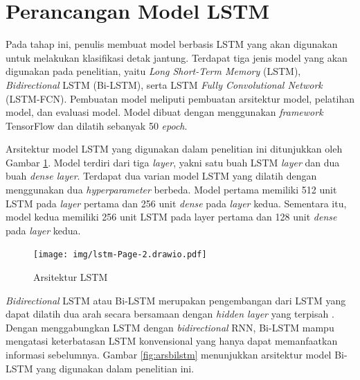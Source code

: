 
\section{Perancangan Model LSTM}
\label{subsec: bab4-pembuatan-model-lstm}
Pada tahap ini, penulis membuat model berbasis LSTM yang akan digunakan untuk melakukan klasifikasi detak jantung. 
Terdapat tiga jenis model yang akan digunakan pada penelitian, yaitu \textit{Long Short-Term Memory} (LSTM), \textit{Bidirectional} LSTM (Bi-LSTM), serta LSTM \textit{Fully Convolutional Network} (LSTM-FCN). 
Pembuatan model meliputi pembuatan arsitektur model, pelatihan model, dan evaluasi model.
Model dibuat dengan menggunakan \textit{framework} TensorFlow dan dilatih sebanyak 50 \textit{epoch}.




Arsitektur model LSTM yang digunakan dalam penelitian ini ditunjukkan oleh Gambar \ref{fig:arslstm}. Model terdiri dari tiga \textit{layer}, yakni satu buah LSTM \textit{layer} dan dua buah \textit{dense layer}. Terdapat dua varian model LSTM yang dilatih dengan menggunakan dua \textit{hyperparameter} berbeda. Model pertama memiliki 512 unit LSTM pada \textit{layer} pertama dan 256 unit \textit{dense} pada \textit{layer} kedua. Sementara itu, model kedua memiliki 256 unit LSTM pada layer pertama dan 128 unit \textit{dense} pada \textit{layer} kedua.

\begin{figure}[H]
  \centering
  \texttt{[image: img/lstm-Page-2.drawio.pdf]}
  \caption{Arsitektur LSTM}
  \label{fig:arslstm}
\end{figure}

\textit{Bidirectional} LSTM atau Bi-LSTM merupakan pengembangan dari LSTM yang dapat dilatih dua arah secara bersamaan dengan \textit{hidden layer} yang terpisah \parencite{yuReviewRecurrentNeural2019}. Dengan menggabungkan LSTM dengan \textit{bidirectional} RNN, Bi-LSTM mampu mengatasi keterbatasan LSTM konvensional yang hanya dapat memanfaatkan informasi sebelumnya. Gambar \ref{fig:arsbilstm} menunjukkan arsitektur model Bi-LSTM yang digunakan dalam penelitian ini.

